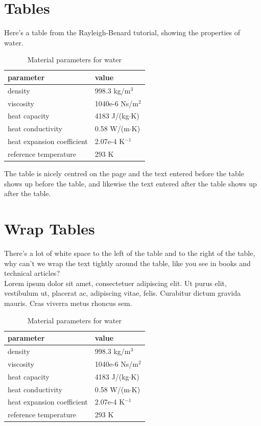 \section{Tables}

Here's a table from the Rayleigh-Benard tutorial, showing the properties of water.\\

\begin{table}[h]
\caption{Material parameters for water}
\label{tb:matpar}
\centering
\begin{tabular}{ll} \hline
parameter  & value \\ \hline
density & 998.3 kg/m$^{3}$ \\
viscosity & 1040e-6 Ns/m$^{2}$ \\
heat capacity & 4183 J/(kg$\cdot$K) \\
heat conductivity & 0.58 W/(m$\cdot$K)       \\
heat expansion coefficient & 2.07e-4 K$^{-1}$      \\ 
reference temperature & 293 K       \\ \hline
\end{tabular}
\end{table}

The table is nicely centred on the page and the text entered before the table shows up before the table, and likewise the text entered  after the table shows up after the table.

\section{Wrap Tables}

There's a lot of white space to the left of the table and to the right of the table, why can't we wrap the text tightly around the table,  like you see in books and technical articles?\\

Lorem ipsum dolor sit amet, consectetuer adipiscing elit. Ut purus elit, vestibulum ut, placerat ac, adipiscing vitae, felis. Curabitur dictum gravida mauris.  Cras viverra metus rhoncus sem.

\begin{table}
\caption{Material parameters for water}
\label{tb:matpar}
\centering
\begin{tabular}{ll} \hline
parameter  & value \\ \hline
density & 998.3 kg/m$^{3}$ \\
viscosity & 1040e-6 Ns/m$^{2}$ \\
heat capacity & 4183 J/(kg$\cdot$K) \\
heat conductivity & 0.58 W/(m$\cdot$K)       \\
heat expansion coefficient & 2.07e-4 K$^{-1}$      \\ 
reference temperature & 293 K       \\ \hline
\end{tabular}
\end{table}

